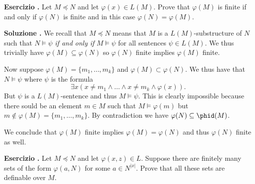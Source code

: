 \documentclass[10pt]{article}
\def\phi{\varphi}
\newcounter{ex}
\newenvironment{exercise}{\clearpage\addtocounter{ex}{1}\textbf{Esercizio \theex.\quad}}{}
\newcounter{sol}
\newenvironment{solution}{\addtocounter{sol}{1}\textbf{Soluzione \theex.\quad}}{}
\begin{document}
\begin{exercise}
  Let $M\preceq N$ and let $\phi(x)\in L(M)$.
  Prove that $\phi(M)$ is finite if and only if $\phi(N)$ is finite and in this case $\phi(N)=\phi(M)$.
\end{exercise}

\begin{solution}
  We recall that \(M\preceq N\) means that \(M\) is a \(L(M)\)-substructure of \(N\) such that  \(N\models\psi\) \textit{if and only if} \(M\models \psi\) for all sentences \(\psi\in L(M)\).
  We thus trivially have \(\phi(M)\subseteq\phi(N)\) so \(\phi(N)\) finite implies \(\phi(M)\) finite.

  Now suppose \(\phi(M) = \big\{m_1,\ldots, m_k\big\}\) and \(\phi(M)\subset\phi(N)\).
  We thus have that \(N\models\psi\) where \(\psi\) is the formula
  \[\exists x(x\neq m_1 \land\ldots\land x\neq m_k\land \phi(x)).\]
  But \(\psi\) is a \(L(M)\)-sentence and thus \(M\models\psi\).
  This is clearly impossible because there sould be an element \(m\in M\) such that \(M\models\phi(m)\) but \(m\not\in\phi(M) = \big\{m_1,\ldots,m_k\big\}\).
  By contradiction we have \(\phi(N)\subseteq\phid(M)\).

  We conclude that \(\phi(M)\) finite implies \(\phi(M) = \phi(N)\) and thus \(\phi(N)\) finite as well.
\end{solution}

\begin{exercise}
  Let $M\preceq N$ and let $\phi(x,z)\in L$.
  Suppose there are finitely many sets of the form $\phi(a,N)$ for some $a\in N^{|x|}$.
  Prove that all these sets are definable over $M$.
\end{exercise}
\end{document}
